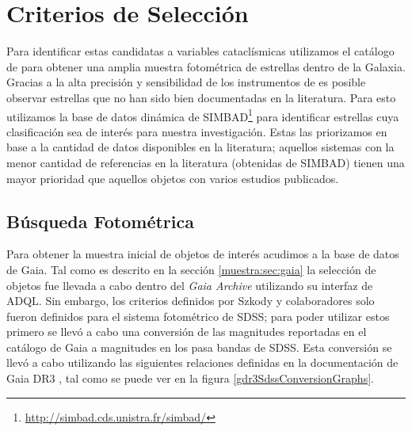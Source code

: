 \section{Criterios de Selección}

Para identificar estas candidatas a variables cataclísmicas utilizamos el
catálogo de \hyperref[muestra:sec:gaia]{\gaia} para obtener una amplia muestra
fotométrica de estrellas dentro de la Galaxia. Gracias a la alta precisión y
sensibilidad de los instrumentos de \gaia es posible observar estrellas que no
han sido bien documentadas en la literatura. Para esto utilizamos la base de
datos dinámica de SIMBAD\footnote{\url{http://simbad.cds.unistra.fr/simbad/}}
para identificar estrellas cuya clasificación sea de interés para nuestra
investigación. Estas las priorizamos en base a la cantidad de datos disponibles
en la literatura; aquellos sistemas con la menor cantidad de referencias en la
literatura (obtenidas de SIMBAD) tienen una mayor prioridad que aquellos
objetos con varios estudios publicados.

\subsection{Búsqueda Fotométrica}

Para obtener la muestra inicial de objetos de interés acudimos a la base de datos de Gaia. Tal como es descrito en la sección \ref{muestra:sec:gaia} la selección de objetos fue llevada a cabo dentro del \textit{Gaia Archive} utilizando su interfaz de ADQL. Sin embargo, los criterios definidos por Szkody y colaboradores solo fueron definidos para el sistema fotométrico de SDSS; para poder utilizar estos primero se llevó a cabo una conversión de las magnitudes reportadas en el catálogo de Gaia a magnitudes en los pasa bandas de SDSS. Esta conversión se llevó a cabo utilizando las siguientes relaciones definidas en la documentación de Gaia DR3 \citet{gdr3ReleaseDocumentation}, tal como se puede ver en la figura \ref{gdr3SdssConversionGraphs}.

